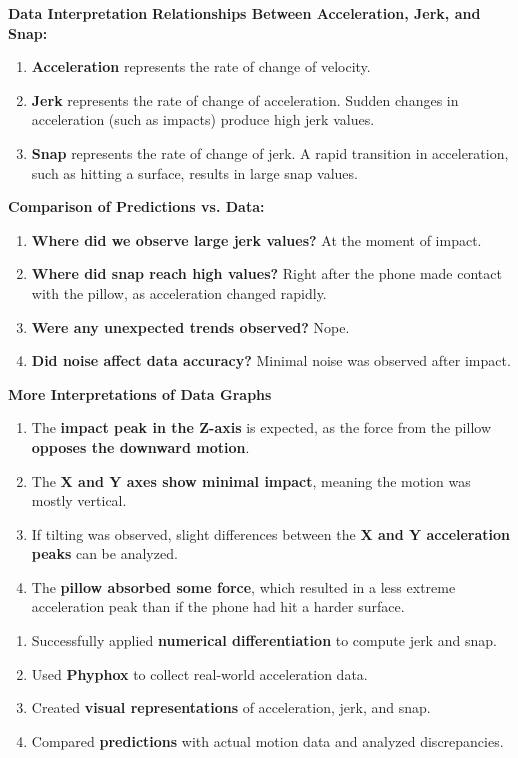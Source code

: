 \documentclass[idxtotoc,hyperref,openany]{labbook} %
\begin{document}
\textbf{Data Interpretation}
\textbf{Relationships Between Acceleration, Jerk, and Snap:}
\begin{enumerate}[$\bullet$]
    \item \textbf{Acceleration} represents the rate of change of velocity.
    \item \textbf{Jerk} represents the rate of change of acceleration. Sudden changes in acceleration (such as impacts) produce high jerk values.
    \item \textbf{Snap} represents the rate of change of jerk. A rapid transition in acceleration, such as hitting a surface, results in large snap values.
\end{enumerate}
\textbf{Comparison of Predictions vs. Data:}
\begin{enumerate}[$\bullet$]
    \item \textbf{Where did we observe large jerk values?} At the moment of impact.
    \item \textbf{Where did snap reach high values?} Right after the phone made contact with the pillow, as acceleration changed rapidly.
    \item \textbf{Were any unexpected trends observed?} Nope.
    \item \textbf{Did noise affect data accuracy?} Minimal noise was observed after impact.
\end{enumerate}
\textbf{More Interpretations of Data Graphs}
\begin{enumerate}[$\bullet$]
    \item The \textbf{impact peak in the Z-axis} is expected, as the force from the pillow \textbf{opposes the downward motion}.
    \item The \textbf{X and Y axes show minimal impact}, meaning the motion was mostly vertical.
    \item If tilting was observed, slight differences between the \textbf{X and Y acceleration peaks} can be analyzed.
    \item The \textbf{pillow absorbed some force}, which resulted in a less extreme acceleration peak than if the phone had hit a harder surface.
\end{enumerate}


\begin{enumerate}[$\bullet$]
    \item Successfully applied \textbf{numerical differentiation} to compute jerk and snap.
    \item Used \textbf{Phyphox} to collect real-world acceleration data.
    \item Created \textbf{visual representations} of acceleration, jerk, and snap.
    \item Compared \textbf{predictions} with actual motion data and analyzed discrepancies.
\end{enumerate}
\end{document}

